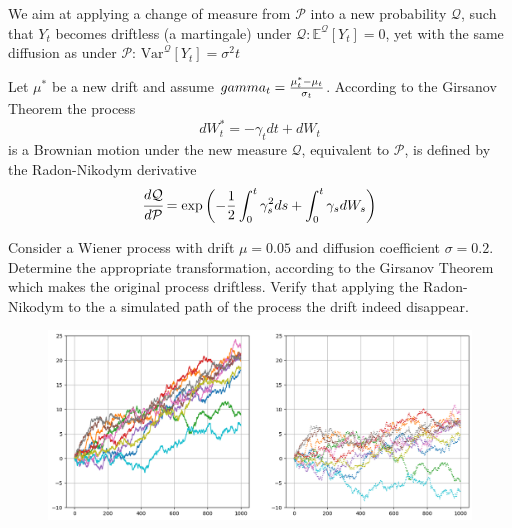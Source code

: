 \documentclass[12pt,a4paper]{article}
\begin{document}
We aim at applying a change of measure from $\mathcal{P}$ into a new probability $\mathcal{Q}$, such that $Y_t$ becomes driftless (a martingale) under $\mathcal{Q}: \mathbb{E}^{\mathcal{Q}}[Y_t]=0$, yet with the same diffusion as under $\mathcal{P}$: $\text{Var}^{\mathcal{Q}}[Y_t]=\sigma^2 t$

Let $\mu^{*}$ be a new drift and assume $\\gamma_t = \frac{\mu_t^{*}-\mu_t}{\sigma_t}$. According to the Girsanov Theorem the process
\begin{equation}
dW^{*}_t = -\gamma_t dt + dW_t
\end{equation}
is a Brownian motion under the new measure $\mathcal{Q}$, equivalent to $\mathcal{P}$, is defined by the Radon-Nikodym derivative
\begin{equation}
\cfrac{d\mathcal{Q}}{d\mathcal{P}} = \exp\left(-\frac{1}{2}\int_0^t\gamma_s^2 ds + \int_0^t\gamma_s dW_s\right)
\end{equation}

\begin{question}
Consider a Wiener process with drift $\mu=0.05$ and diffusion coefficient $\sigma=0.2$. Determine the appropriate transformation, according to the Girsanov Theorem which makes the original process driftless. Verify that applying the Radon-Nikodym to the a simulated path of the process the drift indeed disappear.

\begin{figure}[htbp]
	\begin{center}
		\includegraphics[width=0.5\linewidth]{addons/brownian_motion_girsanov}
	\end{center}
	\label{fig:brownian_motion_girsanov}
\end{figure}
\end{question}
\end{document}
